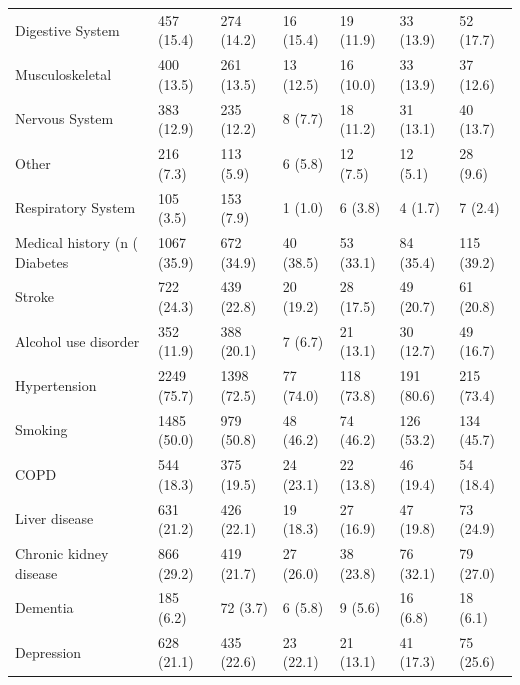 \begin{table}
\begin{tabular}[t]{lllllll}
Digestive System & 457 (15.4) & 274 (14.2) & 16 (15.4) & 19 (11.9) & 33 (13.9) & 52 (17.7)\\
Musculoskeletal & 400 (13.5) & 261 (13.5) & 13 (12.5) & 16 (10.0) & 33 (13.9) & 37 (12.6)\\
\addlinespace
Nervous System & 383 (12.9) & 235 (12.2) & 8 (7.7) & 18 (11.2) & 31 (13.1) & 40 (13.7)\\
Other & 216 (7.3) & 113 (5.9) & 6 (5.8) & 12 (7.5) & 12 (5.1) & 28 (9.6)\\
Respiratory System & 105 (3.5) & 153 (7.9) & 1 (1.0) & 6 (3.8) & 4 (1.7) & 7 (2.4)\\
Medical history (n (%
Diabetes & 1067 (35.9) & 672 (34.9) & 40 (38.5) & 53 (33.1) & 84 (35.4) & 115 (39.2)\\
\addlinespace
Stroke & 722 (24.3) & 439 (22.8) & 20 (19.2) & 28 (17.5) & 49 (20.7) & 61 (20.8)\\
Alcohol use disorder & 352 (11.9) & 388 (20.1) & 7 (6.7) & 21 (13.1) & 30 (12.7) & 49 (16.7)\\
Hypertension & 2249 (75.7) & 1398 (72.5) & 77 (74.0) & 118 (73.8) & 191 (80.6) & 215 (73.4)\\
Smoking & 1485 (50.0) & 979 (50.8) & 48 (46.2) & 74 (46.2) & 126 (53.2) & 134 (45.7)\\
COPD & 544 (18.3) & 375 (19.5) & 24 (23.1) & 22 (13.8) & 46 (19.4) & 54 (18.4)\\
\addlinespace
Liver disease & 631 (21.2) & 426 (22.1) & 19 (18.3) & 27 (16.9) & 47 (19.8) & 73 (24.9)\\
Chronic kidney disease & 866 (29.2) & 419 (21.7) & 27 (26.0) & 38 (23.8) & 76 (32.1) & 79 (27.0)\\
Dementia & 185 (6.2) & 72 (3.7) & 6 (5.8) & 9 (5.6) & 16 (6.8) & 18 (6.1)\\
Depression & 628 (21.1) & 435 (22.6) & 23 (22.1) & 21 (13.1) & 41 (17.3) & 75 (25.6)\\
\bottomrule
\end{tabular}
\end{table}
